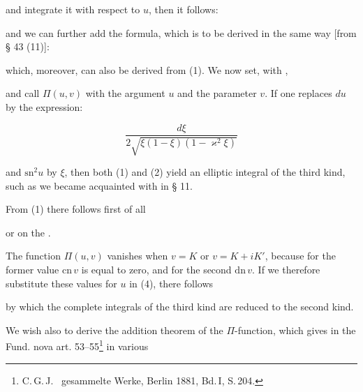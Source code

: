 
and integrate it with respect to $u$, then it follows:


and we can further add the formula, which is to be derived in the
same way [from § 43 (11)]:


which, moreover, can also be derived from (1).
We now set, with ,


and call $\Pi(u,v)$  with the argument $u$ and the parameter $v$. If one
replaces $du$ by the expression:

\[
\dfrac{d\xi}{2\sqrt{\xi(1-\xi)(1-\varkappa^2\xi)}}
\]

and $\mathrm{sn}^2u$ by $\xi$, then both (1) and (2) yield an
elliptic integral of the third kind, such as we became acquainted
with in § 11.

From (1) there follows first of all


or  on the .

The function $\Pi(u,v)$ vanishes when $v=K$ or
$v=K+iK'$, because for the former value $\mathrm{cn}\,v$ is equal to
zero, and for the second $\mathrm{dn}\,v$. If we therefore substitute
these values for $u$ in (4), there follows


by which the complete integrals of the third kind are reduced to the
second kind.

We wish also to derive the addition theorem of the $\Pi$-function, which  gives in the Fund. nova art. 53--55\footnote{C.\,G.\,J.\  gesammelte Werke, Berlin 1881, Bd.\,I, S.\,204.} in various
